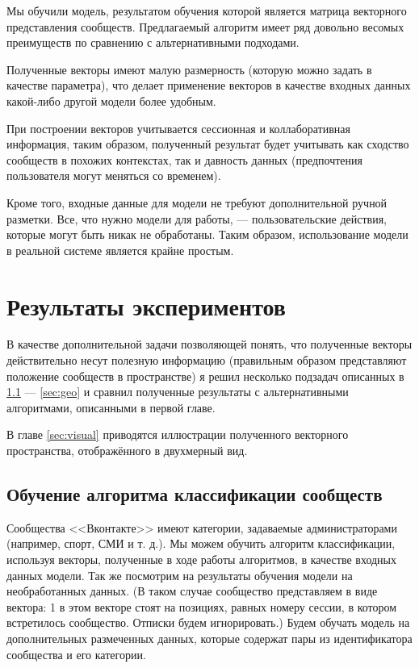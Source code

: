 \documentclass[times,specification,annotation]{itmo-student-thesis}
\begin{document}
Мы обучили модель, результатом обучения которой является матрица векторного
представления сообществ. Предлагаемый алгоритм имеет ряд довольно весомых
преимуществ по сравнению с альтернативными подходами. 

Полученные векторы
имеют малую размерность (которую можно задать в качестве параметра), что
делает применение векторов в качестве входных данных какой-либо другой
модели более удобным. 

При построении векторов учитывается сессионная и
коллаборативная информация, таким образом, полученный результат будет
учитывать как сходство сообществ в похожих контекстах, так и давность данных
(предпочтения пользователя могут меняться со временем). 

Кроме того, входные данные для модели не требуют дополнительной ручной разметки. Все, что нужно модели для работы, --- пользовательские действия, которые могут быть никак не обработаны. Таким образом, использование модели в реальной системе является крайне простым.

\chapter{Результаты экспериментов}

В качестве дополнительной задачи позволяющей понять, что полученные
векторы действительно несут полезную информацию (правильным образом
представляют положение сообществ в пространстве) я решил несколько подзадач
описанных в \ref{sec:class} --- \ref{sec:geo} и сравнил полученные результаты с альтернативными
алгоритмами, описанными в первой главе. 

В главе \ref{sec:visual} приводятся иллюстрации полученного векторного пространства, отображённого в двухмерный вид.

\section{Обучение алгоритма классификации сообществ}\label{sec:class}

Сообщества <<Вконтакте>> имеют категории, задаваемые администраторами
(например, спорт, СМИ и т. д.). Мы можем обучить алгоритм классификации,
используя векторы, полученные в ходе работы алгоритмов, в качестве входных
данных модели. Так же посмотрим на результаты обучения модели на необработанных данных. (В таком случае сообщество представляем в виде вектора: 1 в этом векторе стоят на позициях, равных номеру сессии, в котором встретилось сообщество. Отписки будем игнорировать.)  
Будем обучать модель на дополнительных размеченных данных,
которые содержат пары из идентификатора сообщества и его категории.
\end{document}
